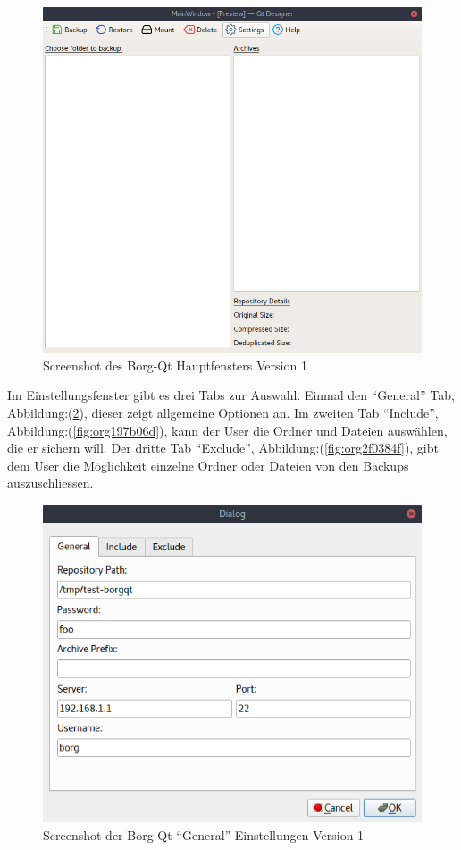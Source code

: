 \begin{figure}
\centering
\includegraphics[width=.9\linewidth]{pictures/borgqt_main_v1.png}
\caption{\label{fig:org0896aa2}
Screenshot des Borg-Qt Hauptfensters Version 1}
\end{figure}

Im Einstellungsfenster gibt es drei Tabs zur Auswahl. Einmal den "`General"' Tab,
Abbildung:(\ref{fig:org90add12}), dieser zeigt allgemeine Optionen
an. Im zweiten Tab "`Include"', Abbildung:(\ref{fig:org197b06d}), kann
der User die Ordner und Dateien auswählen, die er sichern will. Der dritte Tab
"`Exclude"', Abbildung:(\ref{fig:org2f0384f}), gibt dem User die
Möglichkeit einzelne Ordner oder Dateien von den Backups auszuschliessen.

\begin{figure}
\centering
\includegraphics[width=.7\textwidth]{pictures/borgqt_settings_general_v1.png}
\caption{\label{fig:org90add12}
Screenshot der Borg-Qt "`General"' Einstellungen Version 1}
\end{figure}

